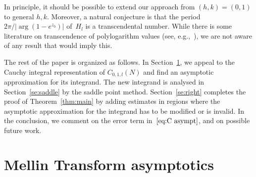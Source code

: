\documentclass[a4paper]{amsart}
\begin{document}
In principle, it should be possible to extend our approach
from $(h,k)=(0,1)$ to general $h,k$.
Moreover, a natural conjecture is that the period $2\pi/|\arg(1-e^{z_0})|$
of~$H_l$ is a transcendental number.
While there is some literature on transcendence of polylogarithm values
(see, e.g.,~\cite{Ha93}), we are not aware of any result that would imply this.

The rest of the paper is organized as follows. In Section~\ref{se:mellin},
we appeal to the Cauchy integral representation of $C_{0,1,l}(N)$
and find an asymptotic approximation for its integrand.
The new integrand is analysed in Section~\ref{se:saddle}
by the saddle point method. Section~\ref{se:right} completes the proof
of Theorem~\ref{thm:main} by adding estimates in regions
where the asymptotic approximation for the integrand has to be
modified or is invalid. In the conclusion, we comment on the error term
in~$\ref{eq:C asympt}$, and on possible future work.



\section{Mellin Transform asymptotics}\label{se:mellin}
\end{document}
